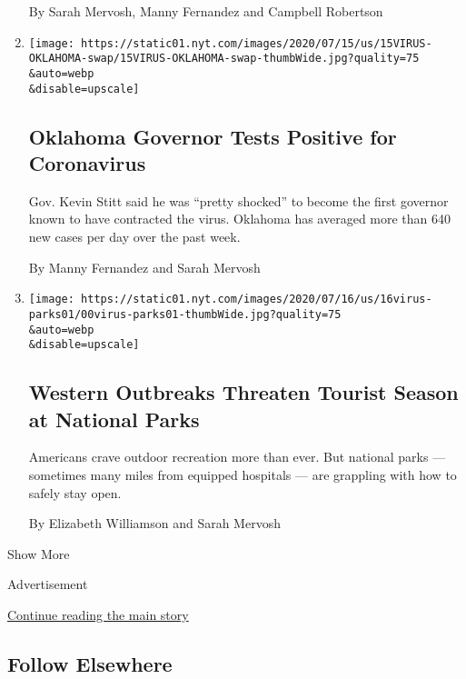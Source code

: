 \begin{enumerate}
  By Sarah Mervosh, Manny Fernandez and Campbell Robertson
\item
  \href{/2020/07/15/us/oklahoma-governor-coronavirus-stitt.html}{}

  \texttt{[image: https://static01.nyt.com/images/2020/07/15/us/15VIRUS-OKLAHOMA-swap/15VIRUS-OKLAHOMA-swap-thumbWide.jpg?quality=75\\\&auto=webp\\\&disable=upscale]}

  \hypertarget{oklahoma-governor-tests-positive-for-coronavirus}{%
  \subsection{Oklahoma Governor Tests Positive for
  Coronavirus}\label{oklahoma-governor-tests-positive-for-coronavirus}}

  Gov. Kevin Stitt said he was ``pretty shocked'' to become the first
  governor known to have contracted the virus. Oklahoma has averaged
  more than 640 new cases per day over the past week.

  By Manny Fernandez and Sarah Mervosh
\item
  \href{/2020/07/15/us/national-parks-reopening.html}{}

  \texttt{[image: https://static01.nyt.com/images/2020/07/16/us/16virus-parks01/00virus-parks01-thumbWide.jpg?quality=75\\\&auto=webp\\\&disable=upscale]}

  \hypertarget{western-outbreaks-threaten-tourist-season-at-national-parks}{%
  \subsection{Western Outbreaks Threaten Tourist Season at National
  Parks}\label{western-outbreaks-threaten-tourist-season-at-national-parks}}

  Americans crave outdoor recreation more than ever. But national parks
  --- sometimes many miles from equipped hospitals --- are grappling
  with how to safely stay open.

  By Elizabeth Williamson and Sarah Mervosh
\end{enumerate}

Show More

Advertisement

\protect\hyperlink{after-mid2}{Continue reading the main story}

\hypertarget{follow-elsewhere}{%
\subsection{Follow Elsewhere}\label{follow-elsewhere}}

